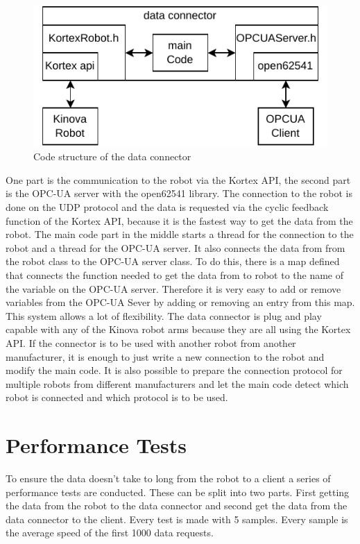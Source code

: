 \documentclass[conference]{IEEEtran}
\begin{document}
\begin{figure}[htbp]
    \centerline{\includegraphics{Pictures/dataConectorStructure.pdf}}
    \caption{Code structure of the data connector}
    \label{fig:dataConectorStructure}
\end{figure}
One part is the communication to the robot via the Kortex API, the second part is the OPC-UA server with the open62541 library.
The connection to the robot is done on the UDP protocol and the data is requested via the cyclic feedback function of the Kortex API, because it is the fastest way to get the data from the robot.
The main code part in the middle  starts a thread for the connection to the robot and a thread for the OPC-UA server.
It also connects the data from from the robot class to the OPC-UA server class.
To do this, there is a map defined that connects the function needed to get the data from to robot to the name of the variable on the OPC-UA server.
Therefore it is very easy to add or remove variables from the OPC-UA Sever by adding or removing an entry from this map.\\
This system allows a lot of flexibility. The data connector is plug and play capable with any of the Kinova robot arms because they are all using the Kortex API.
If the connector is to be used with another robot from another manufacturer, it is enough to just write a new connection to the robot and modify the main code.
It is also possible to prepare the connection protocol for multiple robots from different manufacturers and let the main code detect which robot is connected and which protocol is to be used.

\section{Performance Tests}
To ensure the data doesn't take to long from the robot to a client a series of performance tests are conducted.
These can be split into two parts. 
First getting the data from the robot to the data connector and second get the data from the data connector to the client.
Every test is made with 5 samples. Every sample is the average speed of the first 1000 data requests.
\end{document}
